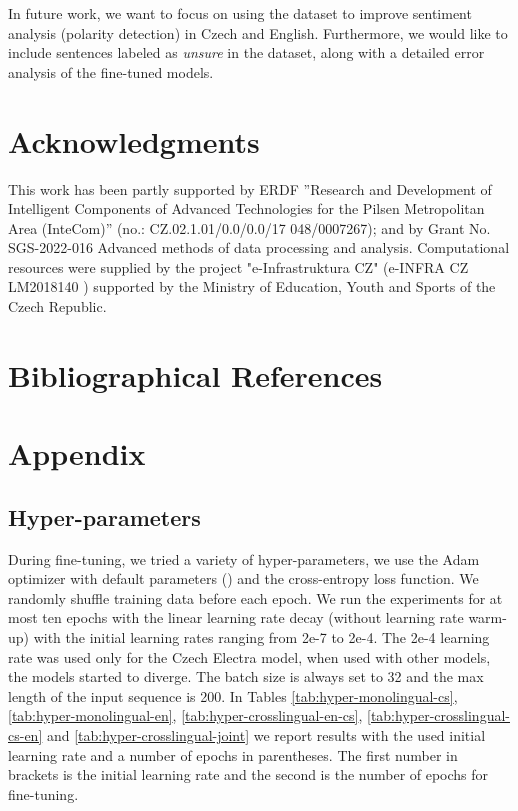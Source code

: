 \documentclass[10pt, a4paper]{article}
\begin{document}
\par In future work, we want to focus on using the dataset to improve sentiment analysis (polarity detection) in Czech and English. Furthermore, we would like to include sentences labeled as \textit{unsure} in the dataset, along with a detailed error analysis of the fine-tuned models.











\section{Acknowledgments}
This work has been partly supported by ERDF ”Research and Development of Intelligent Components of Advanced Technologies for the Pilsen Metropolitan Area (InteCom)” (no.: CZ.02.1.01/0.0/0.0/17 048/0007267); and by Grant No. SGS-2022-016 Advanced methods of data processing and analysis. Computational resources were supplied by the project "e-Infrastruktura CZ" (e-INFRA CZ LM2018140 ) supported by the Ministry of Education, Youth and Sports of the Czech Republic.




\section{Bibliographical References}\label{reference}









\appendix

\section{Appendix}
\subsection{Hyper-parameters}
\label{sec:transformer-appendix}
During fine-tuning, we tried a variety of hyper-parameters, we use the Adam \cite{Kingma-adam} optimizer with default parameters () and the cross-entropy loss function. We randomly shuffle training data before each epoch. We run the experiments for at most ten epochs with the linear learning rate decay (without learning rate warm-up) with the initial learning rates ranging from 2e-7 to 2e-4. The 2e-4 learning rate was used only for the Czech Electra model, when used with other models, the models started to diverge. The batch size is always set to 32 and the max length of the input sequence is 200. In Tables \ref{tab:hyper-monolingual-cs}, \ref{tab:hyper-monolingual-en}, \ref{tab:hyper-crosslingual-en-cs}, \ref{tab:hyper-crosslingual-cs-en} and \ref{tab:hyper-crosslingual-joint} we report results with the used initial learning rate and a number of epochs in parentheses. The first number in brackets is the initial learning rate and the second is the number of epochs for fine-tuning.
\end{document}
